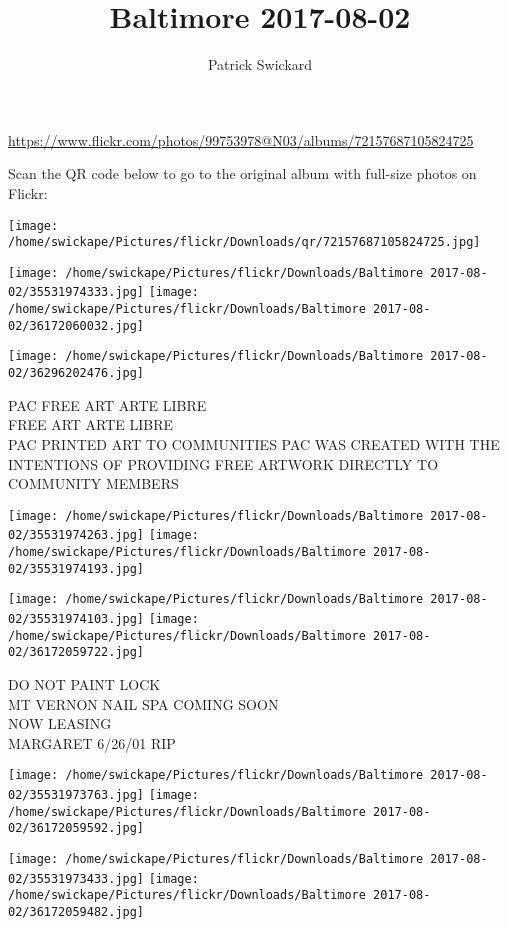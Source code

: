 \documentclass[10pt,letterpaper]{article}
\title{Baltimore 2017-08-02}
\author{Patrick Swickard}
\date{}
\begin{document}
\maketitle

\url{https://www.flickr.com/photos/99753978@N03/albums/72157687105824725}

Scan the QR code below to go to the original album with full-size photos on Flickr:

\texttt{[image: /home/swickape/Pictures/flickr/Downloads/qr/72157687105824725.jpg]}
\pagebreak

\texttt{[image: /home/swickape/Pictures/flickr/Downloads/Baltimore 2017-08-02/35531974333.jpg]}
\texttt{[image: /home/swickape/Pictures/flickr/Downloads/Baltimore 2017-08-02/36172060032.jpg]}

\vspace{0.25in}
\texttt{[image: /home/swickape/Pictures/flickr/Downloads/Baltimore 2017-08-02/36296202476.jpg]}

PAC FREE ART ARTE LIBRE\\
FREE ART ARTE LIBRE\\
PAC PRINTED ART TO COMMUNITIES PAC WAS CREATED WITH THE INTENTIONS OF PROVIDING FREE ARTWORK DIRECTLY TO COMMUNITY MEMBERS
\pagebreak

\texttt{[image: /home/swickape/Pictures/flickr/Downloads/Baltimore 2017-08-02/35531974263.jpg]}
\texttt{[image: /home/swickape/Pictures/flickr/Downloads/Baltimore 2017-08-02/35531974193.jpg]}

\texttt{[image: /home/swickape/Pictures/flickr/Downloads/Baltimore 2017-08-02/35531974103.jpg]}
\texttt{[image: /home/swickape/Pictures/flickr/Downloads/Baltimore 2017-08-02/36172059722.jpg]}

DO NOT PAINT LOCK\\
MT VERNON NAIL SPA COMING SOON\\
NOW LEASING\\
MARGARET 6/26/01 RIP
\pagebreak

\texttt{[image: /home/swickape/Pictures/flickr/Downloads/Baltimore 2017-08-02/35531973763.jpg]}
\texttt{[image: /home/swickape/Pictures/flickr/Downloads/Baltimore 2017-08-02/36172059592.jpg]}

\texttt{[image: /home/swickape/Pictures/flickr/Downloads/Baltimore 2017-08-02/35531973433.jpg]}
\texttt{[image: /home/swickape/Pictures/flickr/Downloads/Baltimore 2017-08-02/36172059482.jpg]}
\end{document}
